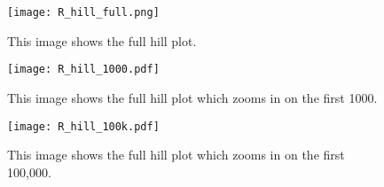 \documentclass[a4paper]{article}
\begin{document}
\begin{figure}
\centering
\texttt{[image: R\_hill\_full.png]}
\caption{\label{fig:hill_full} This image shows the full hill plot.}
\end{figure}

\begin{figure}
\centering
\texttt{[image: R\_hill\_1000.pdf]}
\caption{\label{fig:hill_1000l} This image shows the full hill plot which zooms in on the first 1000.}
\end{figure}

\begin{figure}
\centering
\texttt{[image: R\_hill\_100k.pdf]}
\caption{\label{fig:hill_100k} This image shows the full hill plot which zooms in on the first 100,000.}
\end{figure}




\end{document}
